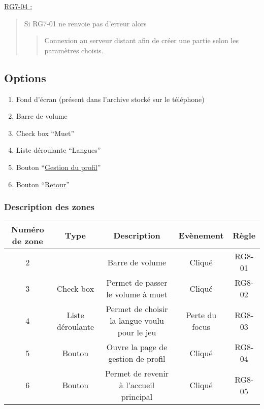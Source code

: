 \documentclass{report}
\begin{document}
			$\,$

			\underline{RG7-04 :}
				\begin{quote}
					 Si RG7-01 ne renvoie pas d'erreur alors 
					 \begin{quote}
					 	Connexion au serveur distant afin de créer une partie selon les paramètres choisis.
					 \end{quote}
				\end{quote}

	 
\newpage

	\subsection{Options}
	
		\hypertarget{Options}{}
		\label{Options}
	
		\begin{center}
			
		\end{center}
				
		\begin{enumerate}
		  \item Fond d'écran (présent dans l'archive stocké sur le téléphone)
		  \item Barre de volume
		  \item Check box ``Muet''
		  \item Liste déroulante ``Langues''
		  \item Bouton ``\hyperlink{Gestion du profil}{Gestion du profil}''
		  \item Bouton ``\hyperlink{Accueil}{Retour}''
		\end{enumerate}

		\subsubsection{Description des zones}
		
			\begin{tabular}{|c|c|c|c|c|} \hline
				Numéro de zone & Type  & Description & Evènement &	Règle \\\hline
				2 & & Barre de volume & Cliqué & RG8-01 \\\hline
				3 & Check box & Permet de passer le volume à muet & Cliqué & RG8-02 \\\hline
				4 & Liste déroulante & Permet de choisir la langue voulu pour le jeu & Perte du focus & RG8-03 \\\hline 
				5 & Bouton & Ouvre la page de gestion de profil & Cliqué & RG8-04 \\\hline 
				6 & Bouton & Permet de revenir à l'accueil principal & Cliqué & RG8-05 \\\hline
			\end{tabular}
			
\end{document}
